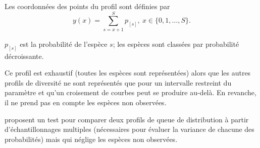 \documentclass[
  11pt,
  french,
  a4paper,
  extrafontsizes,onecolumn,openright
  ]{memoir}
\newenvironment{Shaded}{\begin{snugshade}}{\end{snugshade}}
\newcommand{\CommentTok}[1]{\textcolor[rgb]{0.56,0.35,0.01}{\textit{#1}}}
\newcommand{\DataTypeTok}[1]{\textcolor[rgb]{0.13,0.29,0.53}{#1}}
\newcommand{\DecValTok}[1]{\textcolor[rgb]{0.00,0.00,0.81}{#1}}
\newcommand{\KeywordTok}[1]{\textcolor[rgb]{0.13,0.29,0.53}{\textbf{#1}}}
\newcommand{\NormalTok}[1]{#1}
\newcommand{\OperatorTok}[1]{\textcolor[rgb]{0.81,0.36,0.00}{\textbf{#1}}}
\newcommand{\StringTok}[1]{\textcolor[rgb]{0.31,0.60,0.02}{#1}}
\begin{document}
\begin{Shaded}
\end{Shaded}

\normalsize

Les coordonnées des points du profil sont définies par
\begin{equation}
  \label{eq:ProfilQueue}
  y(x) = \sum_{s=x+1}^{S}{p_{[s]}},\ x\in \{0, 1, \dots, S\}.
\end{equation}

\(p_{[s]}\) est la probabilité de l'espèce \(s\); les espèces sont classées par probabilité décroissante.

Ce profil est exhaustif (toutes les espèces sont représentées) alors que les autres profils de diversité ne sont représentés que pour un intervalle restreint du paramètre et qu'un croisement de courbes peut se produire au-delà.
En revanche, il ne prend pas en compte les espèces non observées.

\textcite{Fattorini1999} proposent un test pour comparer deux profils de queue de distribution à partir d'échantillonnages multiples (nécessaires pour évaluer la variance de chacune des probabilités) mais qui néglige les espèces non observées.
\end{document}
